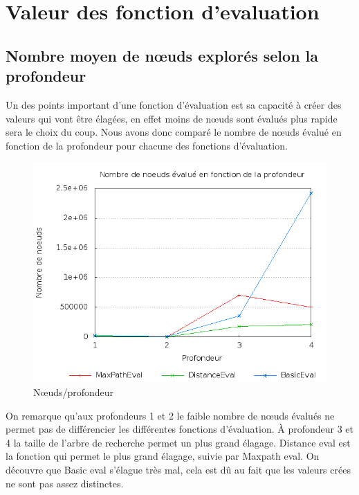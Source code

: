 %

\newpage
\section{Valeur des fonction d'evaluation}

	\subsection{Nombre moyen de n\oe{}uds explorés selon la profondeur}
		
		Un des points important d'une fonction d'évaluation est sa capacité
		à créer des valeurs qui vont être élagées, en effet moins de
		n\oe{}uds sont évalués plus rapide sera le choix du coup.
		Nous avons donc comparé le nombre de n\oe{}uds évalué en fonction
		de la profondeur pour chacune des fonctions d'évaluation.
		
		\begin{figure}[h!]
			\centering
			\includegraphics[width=\textwidth]{images/nbNodeDepth.png}
			\caption{N\oe{}uds/profondeur}
			\label{fig:stats_node_depth}
		\end{figure}
		
		On remarque qu'aux profondeurs 1 et 2 le faible nombre de n\oe{}uds
		évalués ne permet pas de différencier les différentes fonctions d'évaluation.
		\`A profondeur 3 et 4 la taille de l'arbre de recherche permet un plus grand
		élagage. Distance eval est la fonction qui permet le plus grand élagage,
		suivie par Maxpath eval. On découvre que Basic eval s'élague très mal, cela
		est dû au fait que les valeurs crées ne sont pas assez distinctes.
	
